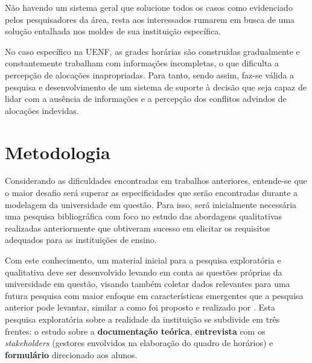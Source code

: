 Não havendo um sistema geral que solucione todos os casos como evidenciado pelos pesquisadores da área, resta aos interessados rumarem em busca de uma solução entalhada nos moldes de sua instituição específica.

No caso específico na UENF, as grades horárias são construídas gradualmente e constantemente trabalham com informações incompletas, o que dificulta a percepção de alocações inapropriadas. Para tanto, sendo assim, faz-se válida a pesquisa e desenvolvimento de um sistema de suporte à decisão que seja capaz de lidar com a ausência de informações e a percepção dos conflitos advindos de alocações indevidas.

\section{Metodologia} \label{sec:Metodologia}            %

Considerando as dificuldades encontradas em trabalhos anteriores, entende-se que o maior desafio será superar as especificidades que serão encontradas durante a modelagem da universidade em questão. Para isso, será inicialmente necessária uma pesquisa bibliográfica com foco no estudo das abordagens qualitativas realizadas anteriormente que obtiveram sucesso em elicitar os requisitos adequados para as instituições de ensino.

Com este conhecimento, um material inicial para a pesquisa exploratória e qualitativa deve ser desenvolvido levando em conta as questões próprias da universidade em questão, visando também coletar dados relevantes para uma futura pesquisa com maior enfoque em características emergentes que a pesquisa anterior pode levantar, similar a como foi proposto e realizado por . Esta pesquisa exploratória sobre a realidade da instituição se subdivide em três frentes: o estudo sobre a \textbf{documentação teórica}, \textbf{entrevista} com os \textit{stakeholders} (gestores envolvidos na elaboração do quadro de horários) e \textbf{formulário} direcionado aos alunos.


